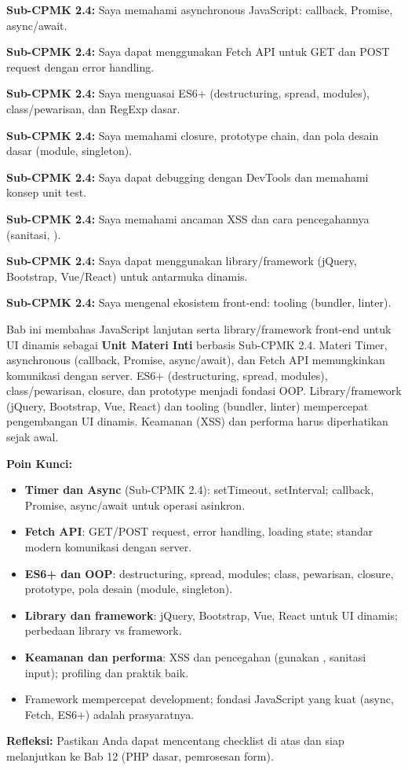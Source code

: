 \documentclass[../main.tex]{subfiles}
\begin{document}
\begin{checklist}
  \item \textbf{Sub-CPMK 2.4:} Saya memahami asynchronous JavaScript: callback, Promise, async/await.
  \item \textbf{Sub-CPMK 2.4:} Saya dapat menggunakan Fetch API untuk GET dan POST request dengan error handling.
  \item \textbf{Sub-CPMK 2.4:} Saya menguasai ES6+ (destructuring, spread, modules), class/pewarisan, dan RegExp dasar.
  \item \textbf{Sub-CPMK 2.4:} Saya memahami closure, prototype chain, dan pola desain dasar (module, singleton).
  \item \textbf{Sub-CPMK 2.4:} Saya dapat debugging dengan DevTools dan memahami konsep unit test.
  \item \textbf{Sub-CPMK 2.4:} Saya memahami ancaman XSS dan cara pencegahannya (sanitasi, ).
  \item \textbf{Sub-CPMK 2.4:} Saya dapat menggunakan library/framework (jQuery, Bootstrap, Vue/React) untuk antarmuka dinamis.
  \item \textbf{Sub-CPMK 2.4:} Saya mengenal ekosistem front-end: tooling (bundler, linter).
\end{checklist}

\begin{rangkuman}
Bab ini membahas JavaScript lanjutan serta library/framework front-end untuk UI dinamis sebagai \textbf{Unit Materi Inti} berbasis Sub-CPMK 2.4. Materi Timer, asynchronous (callback, Promise, async/await), dan Fetch API memungkinkan komunikasi dengan server. ES6+ (destructuring, spread, modules), class/pewarisan, closure, dan prototype menjadi fondasi OOP. Library/framework (jQuery, Bootstrap, Vue, React) dan tooling (bundler, linter) mempercepat pengembangan UI dinamis. Keamanan (XSS) dan performa harus diperhatikan sejak awal.

\textbf{Poin Kunci:}
\begin{itemize}
  \item \textbf{Timer dan Async} (Sub-CPMK 2.4): setTimeout, setInterval; callback, Promise, async/await untuk operasi asinkron.
  \item \textbf{Fetch API}: GET/POST request, error handling, loading state; standar modern komunikasi dengan server.
  \item \textbf{ES6+ dan OOP}: destructuring, spread, modules; class, pewarisan, closure, prototype, pola desain (module, singleton).
  \item \textbf{Library dan framework}: jQuery, Bootstrap, Vue, React untuk UI dinamis; perbedaan library vs framework.
  \item \textbf{Keamanan dan performa}: XSS dan pencegahan (gunakan , sanitasi input); profiling dan praktik baik.
  \item Framework mempercepat development; fondasi JavaScript yang kuat (async, Fetch, ES6+) adalah prasyaratnya.
\end{itemize}

\textbf{Refleksi:} Pastikan Anda dapat mencentang checklist di atas dan siap melanjutkan ke Bab 12 (PHP dasar, pemrosesan form).
\end{rangkuman}

\ifSubfilesClassLoaded{
  \renewcommand{\bibname}{Daftar Pustaka}
  
  
}{}
\end{document}
